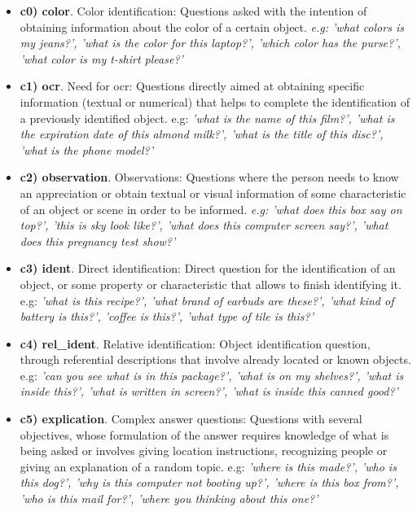 \begin{itemize}
    \item \textbf{c0) color}. Color identification: Questions asked with the intention of obtaining information about the color of a certain object. \emph{e.g:
        'what colors is my jeans?',
        'what is the color for this laptop?',
        'which color has the purse?',
        'what color is my t-shirt please?'}
    
    \item \textbf{c1) ocr}. Need for ocr: Questions directly aimed at obtaining specific information (textual or numerical) that helps to complete the identification of a previously identified object. e.g: \emph{
    'what is the name of this film?',
    'what is the expiration date of this almond milk?',
    'what is the title of this disc?',
    'what is the phone model?'}
    
    \item \textbf{c2) observation}. Observations: Questions where the person needs to know an appreciation or obtain textual or visual information of some characteristic of an object or scene in order to be informed. \emph{e.g:
    'what does this box say on top?',
    'this is sky look like?',
    'what does this computer screen say?',
    'what does this pregnancy test show?'}
    
    \item \textbf{c3) ident}. Direct identification: Direct question for the identification of an object, or some property or characteristic that allows to finish identifying it. e.g: \emph{
    'what is this recipe?',
    'what brand of earbuds are these?',
    'what kind of battery is this?',
    'coffee is this?',
    'what type of tile is this?'}
    
    \item \textbf{c4) rel\_ident}. Relative identification: Object identification question, through referential descriptions that involve already located or known objects. e.g: \emph{
    'can you see what is in this package?',
    'what is on my shelves?',
    'what is inside this?',
    'what is written in screen?',
    'what is inside this canned good?'}
    
    
    \item \textbf{c5) explication}. Complex answer questions: Questions with several objectives, whose formulation of the answer requires knowledge of what is being asked or involves giving location instructions, recognizing people or giving an explanation of a random topic. e.g:\emph{ 
    'where is this made?',
    'who is this dog?',
    'why is this computer not booting up?',
    'where is this box from?',
    'who is this mail for?',
    'where you thinking about this one?'}
    

\end{itemize}
